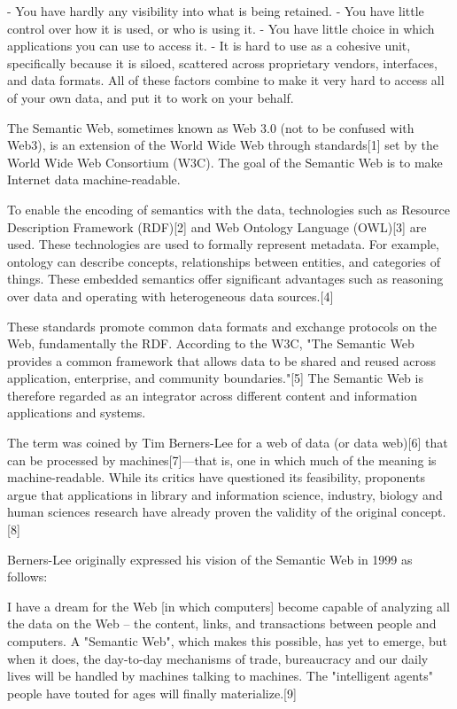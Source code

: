- You have hardly any visibility into what is being retained.
- You have little control over how it is used, or who is using it.
- You have little choice in which applications you can use to access it.
- It is hard to use as a cohesive unit, specifically because it is siloed, scattered across proprietary vendors, interfaces, and data formats.
All of these factors combine to make it very hard to access all of your own data, and put it to work on your behalf.

The Semantic Web, sometimes known as Web 3.0 (not to be confused with Web3), is an extension of the World Wide Web through standards[1] set by the World Wide Web Consortium (W3C). The goal of the Semantic Web is to make Internet data machine-readable.

To enable the encoding of semantics with the data, technologies such as Resource Description Framework (RDF)[2] and Web Ontology Language (OWL)[3] are used. These technologies are used to formally represent metadata. For example, ontology can describe concepts, relationships between entities, and categories of things. These embedded semantics offer significant advantages such as reasoning over data and operating with heterogeneous data sources.[4]

These standards promote common data formats and exchange protocols on the Web, fundamentally the RDF. According to the W3C, "The Semantic Web provides a common framework that allows data to be shared and reused across application, enterprise, and community boundaries."[5] The Semantic Web is therefore regarded as an integrator across different content and information applications and systems.

The term was coined by Tim Berners-Lee for a web of data (or data web)[6] that can be processed by machines[7]—that is, one in which much of the meaning is machine-readable. While its critics have questioned its feasibility, proponents argue that applications in library and information science, industry, biology and human sciences research have already proven the validity of the original concept.[8]

Berners-Lee originally expressed his vision of the Semantic Web in 1999 as follows:

I have a dream for the Web [in which computers] become capable of analyzing all the data on the Web – the content, links, and transactions between people and computers. A "Semantic Web", which makes this possible, has yet to emerge, but when it does, the day-to-day mechanisms of trade, bureaucracy and our daily lives will be handled by machines talking to machines. The "intelligent agents" people have touted for ages will finally materialize.[9]

